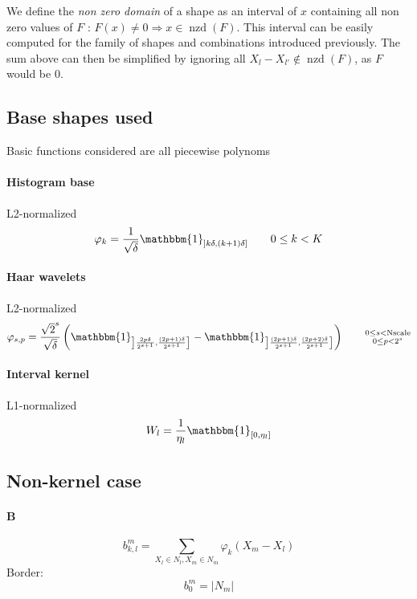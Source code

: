 \documentclass[a4paper,10pt]{article}
\newcommand\Indicator[1]{\mathbbm{1}_{#1}}
\DeclareMathOperator{\nzd}{nzd}
\begin{document}
We define the \emph{non zero domain} of a shape as an interval of $x$ containing all non zero values of $F$ : $F(x) \ne 0 \Rightarrow x \in \nzd(F)$.
This interval can be easily computed for the family of shapes and combinations introduced previously.
The sum above can then be simplified by ignoring all $X_l - X_{l'} \notin \nzd(F)$, as $F$ would be $0$.

\subsection{Base shapes used}
Basic functions considered are all piecewise polynoms

\paragraph{Histogram base} L2-normalized
\[ \varphi_k = \frac{1}{\sqrt{\delta}} \Indicator{\left] k\delta, (k+1)\delta \right]} \qquad 0 \le k < K \]

\paragraph{Haar wavelets} L2-normalized
\[ \varphi_{s,p} = \frac{\sqrt{2}^s}{\sqrt{\delta}} \left(
    \Indicator{ \left] \frac{2p \delta}{2^{s+1}}, \frac{(2p+1) \delta}{2^{s+1}} \right] } -
    \Indicator{ \left] \frac{(2p +1) \delta}{2^{s+1}}, \frac{(2p + 2) \delta}{2^{s+1}} \right] }
\right) \qquad \substack{0 \le s < \text{Nscale} \\ 0 \le p < 2^s} \]

\paragraph{Interval kernel} L1-normalized
\[ W_l = \frac{1}{\eta_l} \Indicator{\left[ 0, \eta_l \right]} \]

\subsection{Non-kernel case}

\paragraph{B}
\[ b_{k,l}^m = \sum_{X_l \in N_l, X_m \in N_m} \varphi_k (X_m - X_l) \]
Border: \[ b_0^m = |N_m| \]
\end{document}
